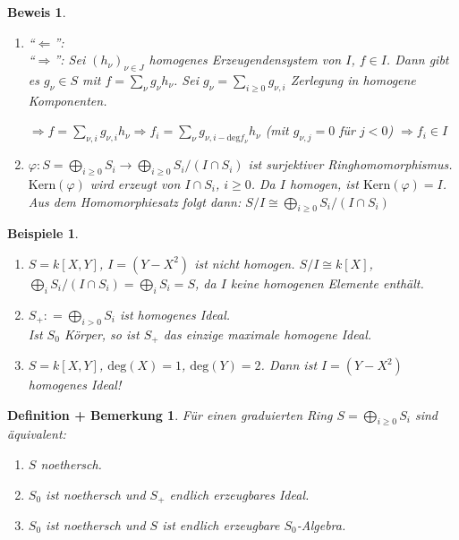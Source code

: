 \documentclass[a4paper,12pt]{scrbook}
\theoremstyle{break}
\newtheorem{DefBem}[Def]{Definition + Bemerkung}
\theoremstyle{nonumberbreak}
\newtheorem{Bew}{Beweis}
\newtheorem{nnBsp}{Beispiele}
\theoremstyle{nonumberplain}
\newcommand{\defeqr}[0]{\mathrel{\mathop:}=}
\begin{document}
\begin{Bew}
\begin{enumerate}
\item[(b)] ``$\Leftarrow$'': \checkmark\\
``$\Rightarrow$'': Sei $(h_{\nu})_{\nu\in J}$ homogenes Erzeugendensystem von $I$,
$f\in I$. Dann gibt es $g_\nu\in S$ mit $f=\sum_{\nu}g_\nu h_\nu$.
Sei $g_\nu=\sum_{i\geq 0}g_{\nu,i}$ Zerlegung in homogene Komponenten.

$\Rightarrow f=\sum_{\nu, i} g_{\nu,i}h_\nu
\Rightarrow f_i=\sum_\nu g_{\nu,i-\textrm{deg} f_\nu}h_\nu$ 
(mit $g_{\nu,j}=0$ für $j< 0$) $\Rightarrow f_i\in I$

\item[(d)] $\varphi: S = \bigoplus_{i \geq 0}S_i\to \bigoplus_{i \geq 0} S_i/(I\cap S_i)$ ist
surjektiver Ringhomomorphismus. $\textrm{Kern}(\varphi)$ wird erzeugt von $I\cap S_i$, $i\geq 0$.
Da $I$ homogen, ist $\textrm{Kern}(\varphi)=I$. Aus dem Homomorphiesatz folgt dann:
$S/I\cong \bigoplus_{i\geq 0}S_i/(I\cap S_i)$
\end{enumerate}
\end{Bew}

\begin{nnBsp}
\begin{enumerate}

\item[(1)] $S=k[X,Y]$, $I=(Y-X^2)$ ist \emph{nicht} homogen.
$S/I\cong k[X]$, $\bigoplus_i S_i/(I\cap S_i)=\bigoplus_i S_i=S$, da $I$ keine homogenen Elemente enthält.

\item[(2)] $S_{+} \defeqr \bigoplus_{i> 0}S_i$ ist homogenes Ideal.\\
Ist $S_0$ Körper, so ist $S_{+}$ das einzige maximale homogene Ideal.

\item[(3)] $S=k[X,Y]$, $\textrm{deg}(X)=1$, $\textrm{deg}(Y)=2$. 
Dann ist $I=(Y-X^2)$ homogenes Ideal!

\end{enumerate}
\end{nnBsp}

\begin{DefBem} \label{2.15}
Für einen graduierten Ring $S=\bigoplus_{i\geq 0} S_i$ sind äquivalent:
\begin{enumerate}
\item[(i)] $S$ noethersch.
\item[(ii)] $S_0$ ist noethersch und $S_{+}$ endlich erzeugbares Ideal.
\item[(iii)] $S_0$ ist noethersch und $S$ ist endlich erzeugbare $S_0$-Algebra.
\end{enumerate}
\end{DefBem}
\end{document}
